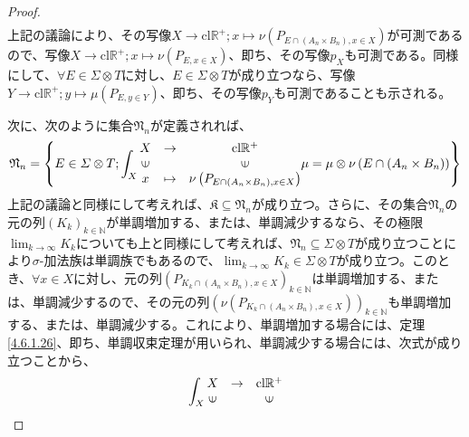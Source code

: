 \documentclass[dvipdfmx]{jsarticle}
\begin{document}
\begin{proof}
\begin{align*}
\end{align*}
上記の議論により、その写像$X \rightarrow \mathrm{cl}\mathbb{R}^{+};x \mapsto \nu\left( P_{E \cap \left( A_{n} \times B_{n} \right),x \in X} \right)$が可測であるので、写像$X \rightarrow \mathrm{cl}\mathbb{R}^{+};x \mapsto \nu\left( P_{E,x \in X} \right)$、即ち、その写像$p_{X}$も可測である。同様にして、$\forall E \in \varSigma \otimes T$に対し、$E \in \varSigma \otimes T$が成り立つなら、写像$Y \rightarrow \mathrm{cl}\mathbb{R}^{+};y \mapsto \mu\left( P_{E,y \in Y} \right)$、即ち、その写像$p_{Y}$も可測であることも示される。\par
次に、次のように集合$\mathfrak{N}_{n}$が定義されれば、
\begin{align*}
\mathfrak{N}_{n} = \left\{ E \in \varSigma \otimes T;\int_{X} {\begin{matrix}
X & \rightarrow & \mathrm{cl}\mathbb{R}^{+} \\
\text{\rotatebox[origin=c]{90}{$\in$}} & & \text{\rotatebox[origin=c]{90}{$\in$}} \\
x & \mapsto & \nu\left( P_{E \cap \left( A_{n} \times B_{n} \right),x \in X} \right) \\
\end{matrix}\mu} = \mu \otimes \nu\left( E \cap \left( A_{n} \times B_{n} \right) \right) \right\}
\end{align*}
上記の議論と同様にして考えれば、$\mathfrak{K \subseteq}\mathfrak{N}_{n}$が成り立つ。さらに、その集合$\mathfrak{N}_{n}$の元の列$\left( K_{k} \right)_{k \in \mathbb{N}}$が単調増加する、または、単調減少するなら、その極限$\lim_{k \rightarrow \infty}K_{k}$についても上と同様にして考えれば、$\mathfrak{N}_{n} \subseteq \varSigma \otimes T$が成り立つことにより$\sigma$-加法族は単調族でもあるので、$\lim_{k \rightarrow \infty}K_{k} \in \varSigma \otimes T$が成り立つ。このとき、$\forall x \in X$に対し、元の列$\left( P_{K_{k} \cap \left( A_{n} \times B_{n} \right),x \in X} \right)_{k \in \mathbb{N}}$は単調増加する、または、単調減少するので、その元の列$\left( \nu\left( P_{K_{k} \cap \left( A_{n} \times B_{n} \right),x \in X} \right) \right)_{k \in \mathbb{N}}$も単調増加する、または、単調減少する。これにより、単調増加する場合には、定理\ref{4.6.1.26}、即ち、単調収束定理が用いられ、単調減少する場合には、次式が成り立つことから、
\begin{align*}
\int_{X} {\begin{matrix}
X & \rightarrow & \mathrm{cl}\mathbb{R}^{+} \\
\text{\rotatebox[origin=c]{90}{$\in$}} & & \text{\rotatebox[origin=c]{90}{$\in$}} \\

\end{matrix}}
\end{align*}
\end{proof}
\end{document}
